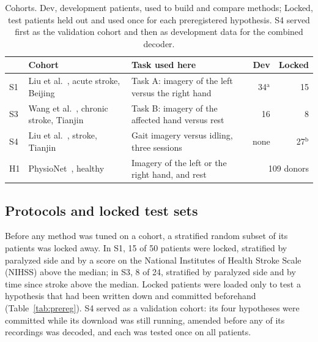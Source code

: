 \documentclass{ieeeaccess}
\begin{document}
\begin{table}[!t]
\caption{Cohorts. Dev, development patients, used to build and compare methods; Locked, test patients held out and used once for each preregistered hypothesis. S4 served first as the validation cohort and then as development data for the combined decoder.}\label{tab:cohorts}
\footnotesize
\begin{tabular}{@{}l>{\raggedright\arraybackslash}p{}>{\raggedright\arraybackslash}p{}rr@{}}
\toprule
 & Cohort & Task used here & Dev & Locked\\
\midrule
S1 & Liu et al.~\cite{liu2024}, acute stroke, Beijing & Task A: imagery of the left versus the right hand & 34$^{\mathrm{a}}$ & 15\\
S3 & Wang et al.~\cite{wang2026}, chronic stroke, Tianjin & Task B: imagery of the affected hand versus rest & 16 & 8\\
S4 & Liu et al.~\cite{liu2025gait}, stroke, Tianjin & Gait imagery versus idling, three sessions & none & 27$^{\mathrm{b}}$\\
H1 & PhysioNet~\cite{schalk2004,goldberger2000}, healthy & Imagery of the left or the right hand, and rest & \multicolumn{2}{r}{109 donors}\\
\bottomrule
\end{tabular}
\par\vspace{2pt}
\par\vspace{2pt}
\end{table}

\subsection{Protocols and locked test sets}\label{sec:protocols}

Before any method was tuned on a cohort, a stratified random subset of its patients was locked away. In S1, 15 of 50 patients were locked, stratified by paralyzed side and by a score on the National Institutes of Health Stroke Scale (NIHSS) above the median; in S3, 8 of 24, stratified by paralyzed side and by time since stroke above the median. Locked patients were loaded only to test a hypothesis that had been written down and committed beforehand (Table~\ref{tab:prereg}). S4 served as a validation cohort: its four hypotheses were committed while its download was still running, amended before any of its recordings was decoded, and each was tested once on all patients.
\end{document}
